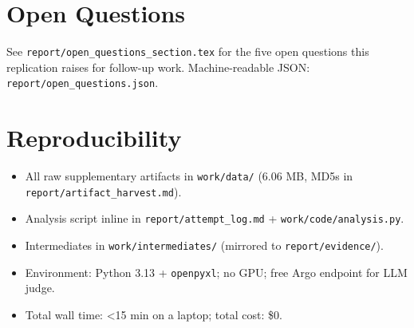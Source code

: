 \documentclass[11pt]{article}
\begin{document}
\section{Open Questions}
See \texttt{report/open\_questions\_section.tex} for the five open questions this replication
raises for follow-up work. Machine-readable JSON: \texttt{report/open\_questions.json}.



\section{Reproducibility}
\begin{itemize}[leftmargin=1.2em]
  \item All raw supplementary artifacts in \texttt{work/data/} (6.06 MB, MD5s in
        \texttt{report/artifact\_harvest.md}).
  \item Analysis script inline in \texttt{report/attempt\_log.md} + \texttt{work/code/analysis.py}.
  \item Intermediates in \texttt{work/intermediates/} (mirrored to \texttt{report/evidence/}).
  \item Environment: Python 3.13 + \texttt{openpyxl}; no GPU; free Argo endpoint for LLM judge.
  \item Total wall time: \textless 15 min on a laptop; total cost: \$0.
\end{itemize}
\end{document}
